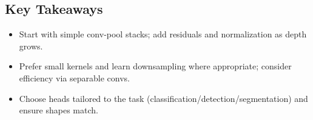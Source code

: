 \subsection*{Key Takeaways}
\begin{itemize}
    \item Start with simple conv-pool stacks; add residuals and normalization as depth grows.
    \item Prefer small kernels and learn downsampling where appropriate; consider efficiency via separable convs.
    \item Choose heads tailored to the task (classification/detection/segmentation) and ensure shapes match.
\end{itemize}


